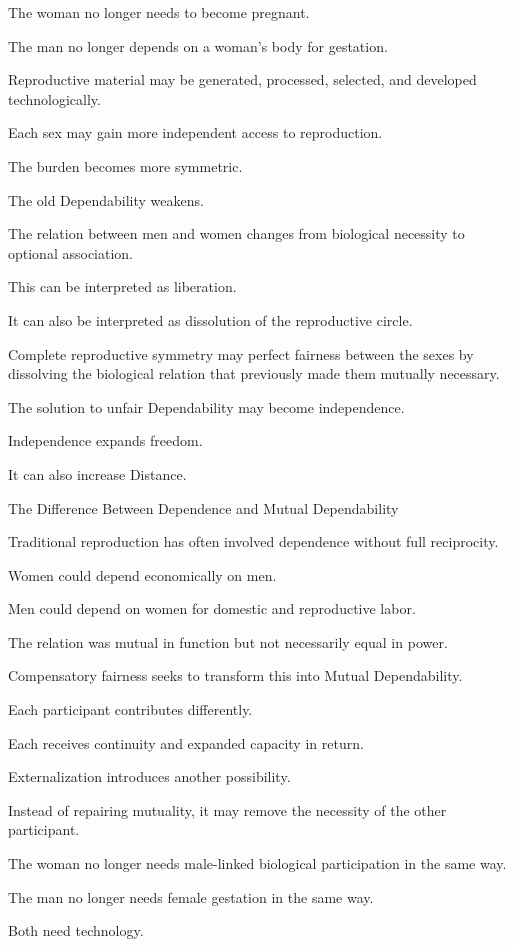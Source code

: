 The woman no longer needs to become pregnant.

The man no longer depends on a woman’s body for gestation.

Reproductive material may be generated, processed, selected, and developed technologically.

Each sex may gain more independent access to reproduction.

The burden becomes more symmetric.

The old Dependability weakens.

The relation between men and women changes from biological necessity to optional association.

This can be interpreted as liberation.

It can also be interpreted as dissolution of the reproductive circle.

Complete reproductive symmetry may perfect fairness between the sexes by dissolving the biological relation that previously made them mutually necessary.

The solution to unfair Dependability may become independence.

Independence expands freedom.

It can also increase Distance.

The Difference Between Dependence and Mutual Dependability

Traditional reproduction has often involved dependence without full reciprocity.

Women could depend economically on men.

Men could depend on women for domestic and reproductive labor.

The relation was mutual in function but not necessarily equal in power.

Compensatory fairness seeks to transform this into Mutual Dependability.

Each participant contributes differently.

Each receives continuity and expanded capacity in return.

Externalization introduces another possibility.

Instead of repairing mutuality, it may remove the necessity of the other participant.

The woman no longer needs male-linked biological participation in the same way.

The man no longer needs female gestation in the same way.

Both need technology.

